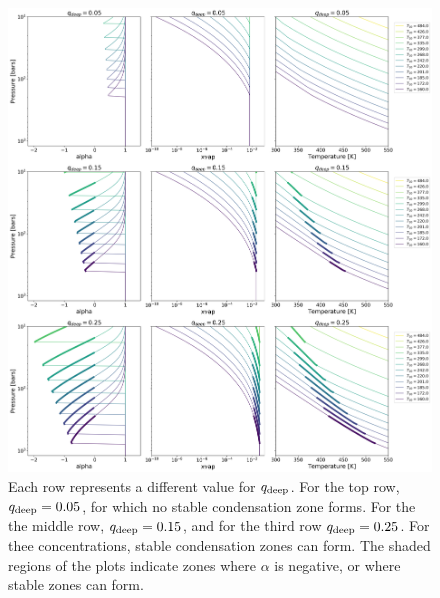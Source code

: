 \documentclass[11pt]{ucscthesisbs}
\begin{document}
\begin{figure}[ht!]
 \centerline{
  \includegraphics[scale=0.36]{figures/convection_inhibited_2.png}
 }
\caption[Inhibition of convection on Uranus]
{Each row represents a different value for $q_{\rm deep}$. For the top row, $q_{\rm deep} = 0.05$, for which no stable condensation zone forms. For the the middle row, $q_{\rm deep} = 0.15$, and for the third row $q_{\rm deep} = 0.25$. For thee concentrations, stable condensation zones can form. The shaded regions of the plots indicate zones where $\alpha$ is negative, or where stable zones can form.}
\label{fig:convection_inhibited}
\end{figure}
\end{document}

